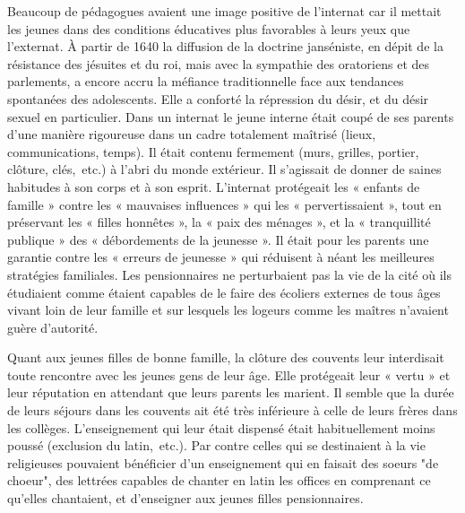 Beaucoup de pédagogues avaient une image positive de l'internat car il mettait les jeunes dans des conditions éducatives plus favorables à leurs yeux que l'externat. À partir de 1640 la diffusion de la doctrine janséniste, en dépit de la résistance des jésuites et du roi, mais avec la sympathie des oratoriens et des parlements, a encore accru la méfiance traditionnelle face aux tendances spontanées des adolescents. Elle a conforté la répression du désir, et du désir sexuel en particulier. Dans un internat le jeune interne était coupé de ses parents d'une manière rigoureuse dans un cadre totalement maîtrisé (lieux, communications, temps). Il était contenu fermement (murs, grilles, portier, clôture, clés,~etc.) à l'abri du monde extérieur. Il s'agissait de donner de saines habitudes à son corps et à son esprit.  L'internat protégeait les « enfants de famille » contre les « mauvaises influences » qui les « pervertissaient », tout en préservant les « filles honnêtes », la « paix des ménages », et la « tranquillité publique » des « débordements de la jeunesse ». Il était pour les parents une garantie contre les « erreurs de jeunesse » qui réduisent à néant les meilleures stratégies familiales. Les pensionnaires ne perturbaient pas la vie de la cité où ils étudiaient comme étaient capables de le faire des écoliers externes de tous âges vivant loin de leur famille et sur lesquels les logeurs comme les maîtres n'avaient guère d'autorité. 

Quant aux jeunes filles de bonne famille, la clôture des couvents leur interdisait toute rencontre avec les jeunes gens de leur âge. Elle protégeait leur « vertu » et leur réputation en attendant que leurs parents les marient. Il semble que la durée de leurs séjours dans les couvents ait été très inférieure à celle de leurs frères dans les collèges. L'enseignement qui leur était dispensé était habituellement moins poussé (exclusion du latin,~etc.). Par contre celles qui se destinaient à la vie religieuses pouvaient bénéficier d'un enseignement qui en faisait des soeurs "de choeur", des lettrées capables de chanter en latin les offices en comprenant ce qu'elles chantaient, et d'enseigner aux jeunes filles pensionnaires.

